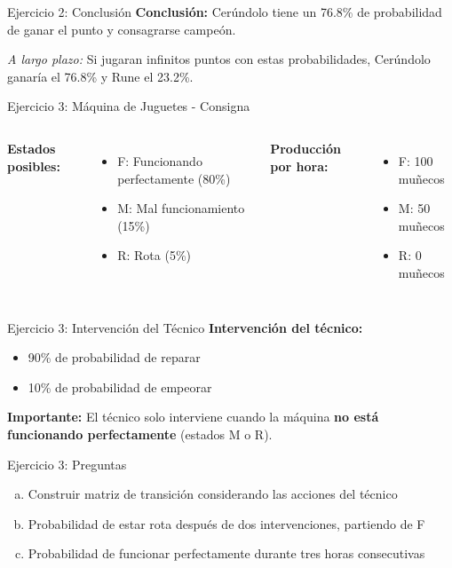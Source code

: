 \documentclass{beamer}
\begin{document}
\begin{frame}{Ejercicio 2: Conclusión}
    \small
    \textbf{Conclusión:} Cerúndolo tiene un 76.8\% de probabilidad de ganar el punto y consagrarse campeón.

    \vspace{1em}

    \textit{A largo plazo:} Si jugaran infinitos puntos con estas probabilidades, Cerúndolo ganaría el 76.8\% y Rune el 23.2\%.
\end{frame}

\begin{frame}{Ejercicio 3: Máquina de Juguetes - Consigna}
    \begin{columns}[T]
        \textbf{Estados posibles:}
        \begin{itemize}
            \item F: Funcionando perfectamente (80\%)
            \item M: Mal funcionamiento (15\%)
            \item R: Rota (5\%)
        \end{itemize}
        
        \textbf{Producción por hora:}
        \begin{itemize}
            \item F: 100 muñecos
            \item M: 50 muñecos
            \item R: 0 muñecos
        \end{itemize}
    \end{columns}
\end{frame}

\begin{frame}{Ejercicio 3: Intervención del Técnico}
    \textbf{Intervención del técnico:}
    \begin{itemize}
        \item 90\% de probabilidad de reparar
        \item 10\% de probabilidad de empeorar
    \end{itemize}

    \vspace{0.5em}

    \textbf{Importante:} El técnico solo interviene cuando la máquina \textbf{no está funcionando perfectamente} (estados M o R).
\end{frame}

\begin{frame}{Ejercicio 3: Preguntas}
    \begin{enumerate}[a)]
        \item Construir matriz de transición considerando las acciones del técnico
        \item Probabilidad de estar rota después de dos intervenciones, partiendo de F
        \item Probabilidad de funcionar perfectamente durante tres horas consecutivas
    \end{enumerate}
\end{frame}
\end{document}
